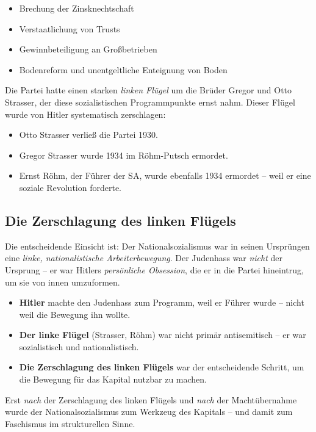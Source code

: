 \begin{itemize}
    \item Brechung der Zinsknechtschaft
    \item Verstaatlichung von Trusts
    \item Gewinnbeteiligung an Großbetrieben
    \item Bodenreform und unentgeltliche Enteignung von Boden
\end{itemize}

Die Partei hatte einen starken \emph{linken Flügel} um die Brüder Gregor und Otto Strasser, der diese sozialistischen Programmpunkte ernst nahm. Dieser Flügel wurde von Hitler systematisch zerschlagen:

\begin{itemize}
    \item Otto Strasser verließ die Partei 1930.
    \item Gregor Strasser wurde 1934 im Röhm-Putsch ermordet.
    \item Ernst Röhm, der Führer der SA, wurde ebenfalls 1934 ermordet – weil er eine soziale Revolution forderte.
\end{itemize}

\subsection{Die Zerschlagung des linken Flügels}

Die entscheidende Einsicht ist: Der Nationalsozialismus war in seinen Ursprüngen eine \emph{linke, nationalistische Arbeiterbewegung}. Der Judenhass war \emph{nicht} der Ursprung – er war Hitlers \emph{persönliche Obsession}, die er in die Partei hineintrug, um sie von innen umzuformen.

\begin{itemize}
    \item \textbf{Hitler} machte den Judenhass zum Programm, weil er Führer wurde – nicht weil die Bewegung ihn wollte.
    \item \textbf{Der linke Flügel} (Strasser, Röhm) war nicht primär antisemitisch – er war sozialistisch und nationalistisch.
    \item \textbf{Die Zerschlagung des linken Flügels} war der entscheidende Schritt, um die Bewegung für das Kapital nutzbar zu machen.
\end{itemize}

Erst \emph{nach} der Zerschlagung des linken Flügels und \emph{nach} der Machtübernahme wurde der Nationalsozialismus zum Werkzeug des Kapitals – und damit zum Faschismus im strukturellen Sinne.

